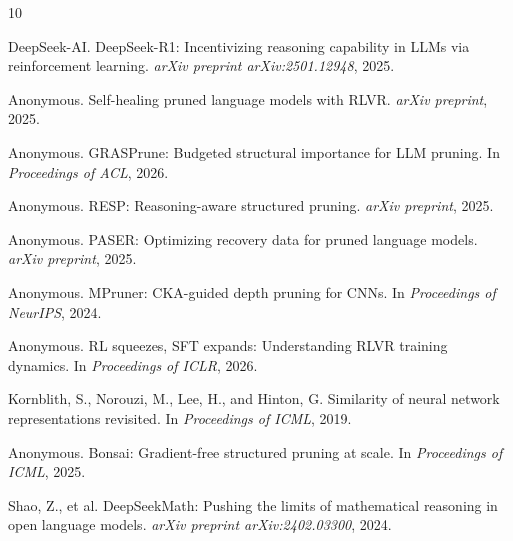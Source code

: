 \documentclass[11pt]{article}
\begin{document}

\begin{thebibliography}{10}

DeepSeek-AI.
\newblock DeepSeek-R1: Incentivizing reasoning capability in LLMs via reinforcement learning.
\newblock \emph{arXiv preprint arXiv:2501.12948}, 2025.

Anonymous.
\newblock Self-healing pruned language models with RLVR.
\newblock \emph{arXiv preprint}, 2025.

Anonymous.
\newblock GRASPrune: Budgeted structural importance for LLM pruning.
\newblock In \emph{Proceedings of ACL}, 2026.

Anonymous.
\newblock RESP: Reasoning-aware structured pruning.
\newblock \emph{arXiv preprint}, 2025.

Anonymous.
\newblock PASER: Optimizing recovery data for pruned language models.
\newblock \emph{arXiv preprint}, 2025.

Anonymous.
\newblock MPruner: CKA-guided depth pruning for CNNs.
\newblock In \emph{Proceedings of NeurIPS}, 2024.

Anonymous.
\newblock RL squeezes, SFT expands: Understanding RLVR training dynamics.
\newblock In \emph{Proceedings of ICLR}, 2026.

Kornblith, S., Norouzi, M., Lee, H., and Hinton, G.
\newblock Similarity of neural network representations revisited.
\newblock In \emph{Proceedings of ICML}, 2019.

Anonymous.
\newblock Bonsai: Gradient-free structured pruning at scale.
\newblock In \emph{Proceedings of ICML}, 2025.

Shao, Z., et al.
\newblock DeepSeekMath: Pushing the limits of mathematical reasoning in open language models.
\newblock \emph{arXiv preprint arXiv:2402.03300}, 2024.

\end{thebibliography}
\end{document}
